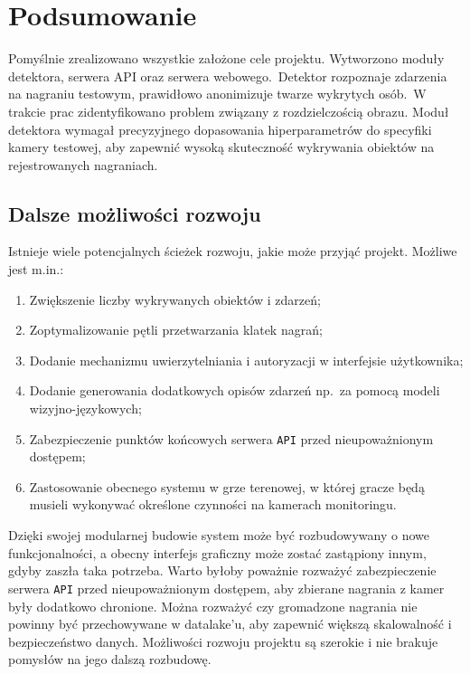 \chapter{Podsumowanie}
Pomyślnie zrealizowano wszystkie założone cele projektu. Wytworzono moduły detektora, serwera API oraz serwera webowego.\ Detektor rozpoznaje zdarzenia na nagraniu testowym, prawidłowo anonimizuje twarze wykrytych osób.\ W trakcie prac zidentyfikowano problem związany z rozdzielczością obrazu. Moduł detektora wymagał precyzyjnego dopasowania hiperparametrów do specyfiki kamery testowej, aby zapewnić wysoką skuteczność wykrywania obiektów na rejestrowanych nagraniach.

\section{Dalsze możliwości rozwoju}
Istnieje wiele potencjalnych ścieżek rozwoju, jakie może przyjąć projekt. Możliwe jest m.in.:
\begin{enumerate}
\item Zwiększenie liczby wykrywanych obiektów i zdarzeń;
\item Zoptymalizowanie pętli przetwarzania klatek nagrań;
\item Dodanie mechanizmu uwierzytelniania i autoryzacji w interfejsie użytkownika;
\item Dodanie generowania dodatkowych opisów zdarzeń np.\ za pomocą modeli wizyjno-językowych;
\item Zabezpieczenie punktów końcowych serwera \texttt{API} przed nieupoważnionym dostępem;
\item Zastosowanie obecnego systemu w grze terenowej, w której gracze będą musieli wykonywać określone czynności na kamerach monitoringu. 
\end{enumerate}
Dzięki swojej modularnej budowie system może być rozbudowywany o nowe funkcjonalności, a obecny interfejs graficzny może zostać zastąpiony innym, gdyby zaszła taka potrzeba. Warto byłoby poważnie rozważyć
zabezpieczenie serwera \texttt{API} przed nieupoważnionym dostępem, aby zbierane nagrania z kamer były dodatkowo chronione. Można rozważyć czy gromadzone nagrania nie powinny być przechowywane w datalake'u, aby
zapewnić większą skalowalność i bezpieczeństwo danych. Możliwości rozwoju projektu są szerokie i nie brakuje pomysłów na jego dalszą rozbudowę.